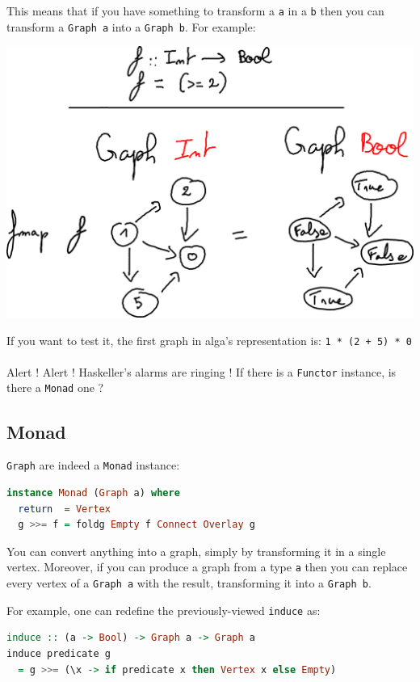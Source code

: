 \documentclass[10pt,a4paper]{article}
\begin{document}
This means that if you have something to transform a \verb|a| in a \verb|b| then you can transform a \verb|Graph a| into a \verb|Graph b|. For example:

\begin{center}
	\includegraphics[scale=0.5]{figspng/fmap.png}
\end{center}

If you want to test it, the first graph in alga's representation is: \verb|1 * (2 + 5) * 0|
\\
\\
Alert ! Alert ! Haskeller's alarms are ringing ! If there is a \verb|Functor| instance, is there a \verb|Monad| one ?

\subsection{Monad}
\verb|Graph| are indeed a \verb|Monad| instance:
\begin{lstlisting}[language=Haskell, frame=single]
instance Monad (Graph a) where
  return  = Vertex
  g >>= f = foldg Empty f Connect Overlay g 
\end{lstlisting}

You can convert anything into a graph, simply by transforming it in a single vertex. Moreover, if you can produce a graph from a type \verb|a| then you can replace every vertex of a \verb|Graph a| with the result, transforming it into a \verb|Graph b|.

For example, one can redefine the previously-viewed \verb|induce| as:

\begin{lstlisting}[language=Haskell, frame=single]
induce :: (a -> Bool) -> Graph a -> Graph a
induce predicate g
  = g >>= (\x -> if predicate x then Vertex x else Empty)
\end{lstlisting}
\end{document}
